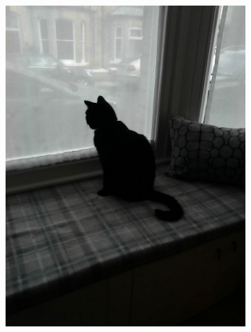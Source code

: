 \documentclass{l4proj}
\begin{document}
\begin{figure}[ht]
  \centering
  \begin{subfigure}[h!]{0.18\textwidth}
    \includegraphics[width=\textwidth, trim={0cm 6cm 0cm 6cm}, clip]{images/dataset/cat/rgb.png}

\end{subfigure}
\end{figure}
\end{document}
